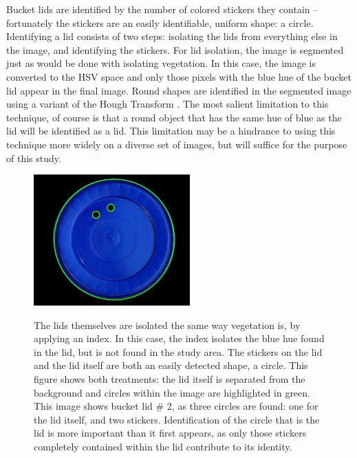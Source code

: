 \documentclass[letterpaper]{article}
\begin{document}
{Bucket lids are identified by the number of colored stickers they contain -- fortunately the stickers are an easily identifiable, uniform shape: a circle. Identifying a lid consists of two steps: isolating the lids from everything else in the image, and identifying the stickers. For lid isolation, the image is segmented just as would be done with isolating vegetation. In this case, the image is converted to the HSV space and only those pixels with the blue hue of the bucket lid appear in the final image. Round shapes are identified in the segmented image using a variant of the Hough Transform \parencite{Ballard1981-oc}. The most salient limitation to this technique, of course is that a round object that has the same hue of blue as the lid will be identified as a lid. This limitation may be a hindrance to using this technique more widely on a diverse set of images, but will suffice for the purpose of this study.
\begin{figure}[h!]
	\centering
	\includegraphics[width=6cm]{./figures/lid-segmented.jpg}
	\label{fig:bucket-segmented}
	\caption[Identification of specific bucket lids]{The lids themselves are isolated the same way vegetation is, by applying an index. In this case, the index isolates the blue hue found in the lid, but is not found in the study area. The stickers on the lid and the lid itself are both an easily detected shape, a circle. This figure shows both treatments: the lid itself is separated from the background and circles within the image are highlighted in green. This image shows bucket lid \# 2, as three circles are found: one for the lid itself, and two stickers. Identification of the circle that is the lid is more important than it first appears, as only those stickers completely contained within the lid contribute to its identity.}
\end{figure}	


}
\end{document}

